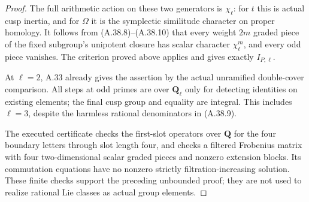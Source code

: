 \begin{proof}
The full arithmetic action on these two generators
is \(\chi_\ell\): for \(t\) this is actual cusp
inertia, and for \(\Omega\) it is the symplectic
similitude character on proper homology. It follows
from (A.38.8)--(A.38.10) that every weight \(2m\)
graded piece of the fixed subgroup's unipotent
closure has scalar character \(\chi_\ell^m\),
and every odd piece vanishes. The criterion proved
above applies and gives exactly \(I_{P,\ell}\).

At \(\ell=2\), A.33 already gives the assertion
by the actual unramified double-cover comparison.
All steps at odd primes are over \(\mathbf Q_\ell\)
only for detecting identities on existing elements;
the final cusp group and equality are integral.
This includes \(\ell=3\), despite the harmless
rational denominators in (A.38.9).

The executed certificate 
checks the first-slot operators over \(\mathbf Q\)
for the four boundary letters through slot length
four, and checks a filtered Frobenius matrix with
four two-dimensional scalar graded pieces and
nonzero extension blocks. Its commutation equations
have no nonzero strictly filtration-increasing
solution. These finite checks support the preceding
unbounded proof; they are not used to realize
rational Lie classes as actual group elements.
\end{proof}
